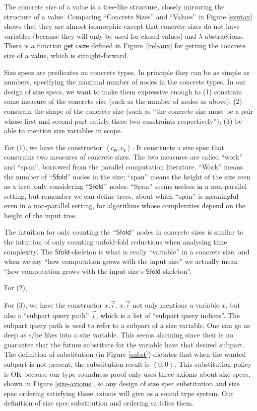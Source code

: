 \documentclass[preprint]{sigplanconf}
\newcommand{\symSfold}{\mathsf{Sfold}}
\newcommand{\getcsize}{\mathsf{get\_csize}}
\newcommand{\symwork}{\mathsf{w}}
\newcommand{\symspan}{\mathsf{s}}
\newcommand{\Sstats}[1]{\left \langle #1 \right \rangle}
\begin{document}
The concrete size of a value is a tree-like structure, closely mirroring the structure of a value. Comparing ``Concrete Sizes'' and ``Values'' in Figure \ref{syntax} shows that they are almost isomorphic except that concrete sizes do not have variables (because they will only be used for closed values) and $\lambda$-abstractions. There is a function $\getcsize$ defined in Figure \ref{lrel-aux} for getting the concrete size of a value, which is straight-forward.

Size specs are predicates on concrete types. In principle they can be as simple as numbers, specifying the maximal number of nodes in the concrete types. In our design of size specs, we want to make them expressive enough to (1) constrain some measure of the concrete size (such as the number of nodes as above); (2) constrain the shape of the concrete size (such as ``the concrete size must be a pair whose first and second part satisfy these two constraints respectively''); (3) be able to mention size variables in scope.

For (1), we have the constructor $\Sstats{c_\symwork,c_\symspan}$. It constructs a size spec that constrains two measures of concrete sizes. The two measures are called ``work'' and ``span'', borrowed from the parallel computation literature. ``Work'' means the number of ``$\symSfold$'' nodes in the size; ``span'' means the height of the size seen as a tree, only considering ``$\symSfold$'' nodes. ``Span'' seems useless in a non-parallel setting, but remember we can define trees, about which ``span'' is meaningful even in a non-parallel setting, for algorithms whose complexities depend on the height of the input tree. 

The intuition for only counting the  ``$\symSfold$'' nodes in concrete sizes is similar to the intuition of only counting unfold-fold reductions when analysing time complexity. The $\symSfold$-skeleton is what is really ``variable'' in a concrete size, and when we say ``how computation grows with the input size'' we actually mean ``how computation grows with the input size's $\symSfold$-skeleton''.

For (2),

For (3), we have the constructor $x.\vec{i}$. $x.\vec{i}$ not only mentions a variable $x$, but also a ``subpart query path'' $\vec{i}$, which is a list of ``subpart query indices''. The subpart query path is used to refer to a subpart of a size variable. One can go as deep as s/he likes into a size variable. This seems alarming since their is no guarantee that the future substitute for the variable have that desired subpart. The definition of substitution (in Figure \ref{subst}) dictates that when the wanted subpart is not present, the substitution result is $\Sstats{0,0}$. This substitution policy is OK because our type soundness proof only uses three axioms about size specs, shown in Figure \ref{size-axioms}, so any design of size spec substitution and size spec ordering satisfying these axioms will give us a sound type system. Our definition of size spec substitution and ordering satisfies them. 
\end{document}
